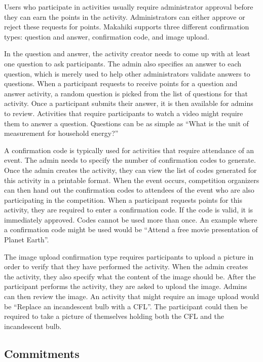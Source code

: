 Users who participate in activities usually require administrator approval before they can earn the points in the activity.  Administrators can either approve or reject these requests for points.  Makahiki supports three different confirmation types: question and answer, confirmation code, and image upload.

In the question and answer, the activity creator needs to come up with at least one question to ask participants.  The admin also specifies an answer to each question, which is merely used to help other administrators validate answers to questions.  When a participant requests to receive points for a question and answer activity, a random question is picked from the list of questions for that activity.  Once a participant submits their answer, it is then available for admins to review.  Activities that require participants to watch a video might require them to answer a question.  Questions can be as simple as ``What is the unit of measurement for household energy?''

A confirmation code is typically used for activities that require attendance of an event.  The admin needs to specify the number of confirmation codes to generate.  Once the admin creates the activity, they can view the list of codes generated for this activity in a printable format.  When the event occurs, competition organizers can then hand out the confirmation codes to attendees of the event who are also participating in the competition.  When a participant requests points for this activity, they are required to enter a confirmation code.  If the code is valid, it is immediately approved.  Codes cannot be used more than once.  An example where a confirmation code might be used would be ``Attend a free movie presentation of Planet Earth''.

The image upload confirmation type requires participants to upload a picture in order to verify that they have performed the activity.  When the admin creates the activity, they also specify what the content of the image should be.  After the participant performs the activity, they are asked to upload the image.  Admins can then review the image.  An activity that might require an image upload would be ``Replace an incandescent bulb with a CFL''.  The participant could then be required to take a picture of themselves holding both the CFL and the incandescent bulb.

\subsection{Commitments}

